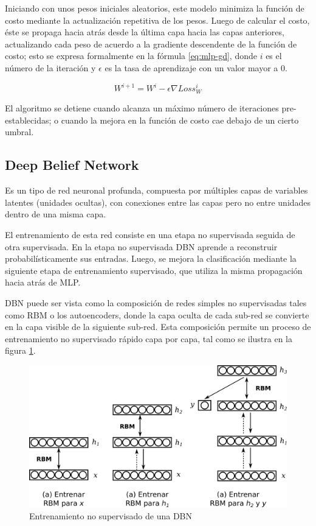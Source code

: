 Iniciando con unos pesos iniciales aleatorios, este modelo minimiza la función de costo mediante la actualización repetitiva de los pesos. Luego de calcular el costo, éste se propaga hacia atrás desde la última capa hacia las capas anteriores, actualizando cada peso de acuerdo a la gradiente descendente de la función de costo; esto se expresa formalmente en la fórmula \ref{eq:mlp-gd}, donde $i$ es el número de la iteración y $\epsilon$ es la tasa de aprendizaje con un valor mayor a $0$.

\begin{equation}
	\label{eq:mlp-gd}
	W^{i+1} = W^i - \epsilon \nabla Loss_W^i
\end{equation}

El algoritmo se detiene cuando alcanza un máximo número de iteraciones pre-establecidas; o cuando la mejora en la función de costo cae debajo de un cierto umbral.

\subsection{Deep Belief Network}

Es un tipo de red neuronal profunda, compuesta por múltiples capas de variables latentes (unidades ocultas), con conexiones entre las capas pero no entre unidades dentro de una misma capa.

El entrenamiento de esta red consiste en una etapa no supervisada seguida de otra supervisada. En la etapa no supervisada \ac{DBN} aprende a reconstruir probabilísticamente sus entradas. Luego, se mejora la clasificación mediante la siguiente etapa de entrenamiento supervisado, que utiliza la misma propagación hacia atrás de \ac{MLP}.

\ac{DBN} puede ser vista como la composición de redes simples no supervisadas tales como \ac{RBM} o los autoencoders, donde la capa oculta de cada sub-red se convierte en la capa visible de la siguiente sub-red. Esta composición permite un proceso de entrenamiento no supervisado rápido capa por capa, tal como se ilustra en la figura \ref{fig:dbn-train}.

\begin{figure}[htbp]
	\centering
	\includegraphics[width=0.9\linewidth]{graficos/propios/entrenamiento_dbn.png}
	\caption{Entrenamiento no supervisado de una DBN \citep{beysolow2017autoencoders}}
	\label{fig:dbn-train}
\end{figure}

